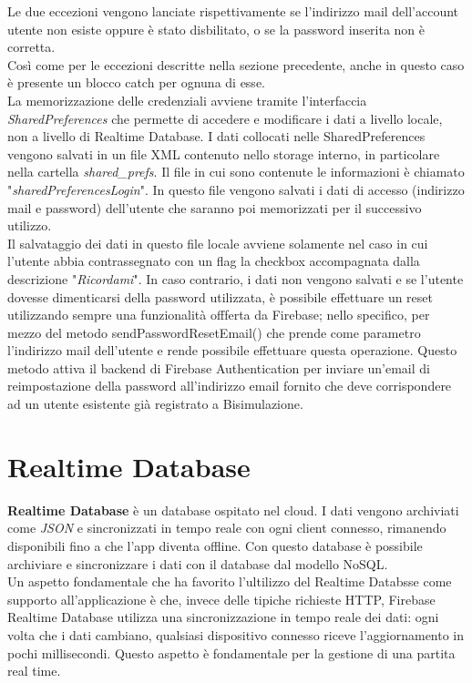 \documentclass[a4paper,11pt,twoside,openright]{report}
\begin{document}
Le due eccezioni vengono lanciate rispettivamente se l'indirizzo mail dell'account utente non esiste oppure è stato disbilitato, o se la password inserita non è corretta.\\
Così come per le eccezioni descritte nella sezione precedente, anche in questo caso è presente un blocco catch per ognuna di esse.\\
La memorizzazione delle credenziali avviene tramite l'interfaccia \textit{SharedPreferences}\cite{6} che permette di accedere e modificare i dati a livello locale, non a livello di Realtime Database.
I dati collocati nelle SharedPreferences vengono salvati in un file XML contenuto nello storage interno, in particolare nella cartella \textit{shared\_prefs}. Il file in cui sono contenute le informazioni è chiamato "\textit{sharedPreferencesLogin}". In questo file vengono salvati i dati di accesso (indirizzo mail e password) dell'utente che saranno poi memorizzati per il successivo utilizzo.\\
Il salvataggio dei dati in questo file locale avviene solamente nel caso in cui l'utente abbia contrassegnato con un flag la checkbox accompagnata dalla descrizione "\textit{Ricordami}". In caso contrario, i dati non vengono salvati e se l'utente dovesse dimenticarsi della password utilizzata, è possibile effettuare un reset utilizzando sempre una funzionalità offferta da Firebase; nello specifico, per mezzo del metodo sendPasswordResetEmail() che prende come parametro l'indirizzo mail dell'utente e rende possibile effettuare questa operazione. Questo metodo attiva il backend di Firebase Authentication per inviare un'email di reimpostazione della password all'indirizzo email fornito che deve corrispondere ad un utente esistente già registrato a Bisimulazione.

\section{Realtime Database}
\textbf{Realtime Database} è un database ospitato nel cloud. I dati vengono archiviati come \textit{JSON} e sincronizzati in tempo reale con ogni client connesso, rimanendo disponibili fino a che l'app diventa offline. Con questo database è possibile archiviare e sincronizzare i dati con il database dal modello NoSQL\cite{7}.\\
Un aspetto fondamentale che ha favorito l'ultilizzo del Realtime Databsse come supporto all'applicazione è che, invece delle tipiche richieste HTTP, Firebase Realtime Database utilizza una sincronizzazione in tempo reale dei dati: ogni volta che i dati cambiano, qualsiasi dispositivo connesso riceve l'aggiornamento in pochi millisecondi. Questo aspetto è fondamentale per la gestione di una partita real time.\\
\end{document}
